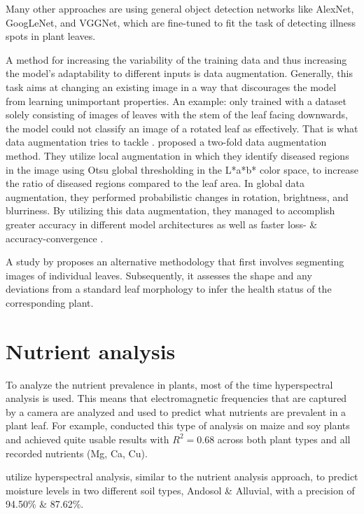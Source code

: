 \documentclass[draft,final]{vutinfth} %
\begin{document}
Many other approaches are using general object detection networks like AlexNet, GoogLeNet, and VGGNet, which are fine-tuned to fit the task of detecting illness spots in plant leaves. \cite{applalanaidu_review_2021}

A method for increasing the variability of the training data and thus increasing the model's adaptability to different inputs is data augmentation. Generally, this task aims at changing an existing image in a way that discourages the model from learning unimportant properties. An example: only trained with a dataset solely consisting of images of leaves with the stem of the leaf facing downwards, the model could not classify an image of a rotated leaf as effectively. That is what data augmentation tries to tackle \cite{perez_effectiveness_2017}. \citeauthor{wongbongkotpaisan_plant_2021} proposed a two-fold data augmentation method. They utilize local augmentation in which they identify diseased regions in the image using Otsu global thresholding in the L*a*b* color space, to increase the ratio of diseased regions compared to the leaf area. In global data augmentation, they performed probabilistic changes in rotation, brightness, and blurriness. By utilizing this data augmentation, they managed to accomplish greater accuracy in different model architectures as well as faster loss- \& accuracy-convergence \cite{wongbongkotpaisan_plant_2021}.

A study by \citeauthor{xu_research_2022} proposes an alternative methodology that first involves segmenting images of individual leaves. Subsequently, it assesses the shape and any deviations from a standard leaf morphology to infer the health status of the corresponding plant. \cite{xu_research_2022}

\section{Nutrient analysis} \label{sec:nutrient_analysis}
To analyze the nutrient prevalence in plants, most of the time hyperspectral analysis is used. This means that electromagnetic frequencies that are captured by a camera are analyzed and used to predict what nutrients are prevalent in a plant leaf. For example, \citeauthor{pandey_high_2017} conducted this type of analysis on maize and soy plants and achieved quite usable results with $R^2=0.68$ across both plant types and all recorded nutrients (Mg, Ca, Cu). \cite{pandey_high_2017}

\citeauthor{as_image_2022} utilize hyperspectral analysis, similar to the nutrient analysis approach, to predict moisture levels in two different soil types, Andosol \& Alluvial, with a precision of 94.50\% \& 87.62\%. \cite{as_image_2022}
\end{document}
